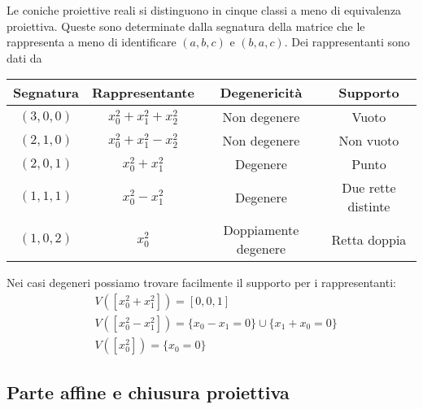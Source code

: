 \begin{multicols*}{2}
    \begin{theorem}
    Le coniche proiettive reali si distinguono in cinque classi a meno di equivalenza proiettiva. Queste sono determinate dalla segnatura della matrice che le rappresenta a meno di identificare $(a,b,c)$ e $(b,a,c)$. Dei rappresentanti sono dati da
    \begin{center}
    \footnotesize{\begin{tabular}{|c|c|c|c|}
    \hline
    Segnatura & Rappresentante & Degenericit\`a & Supporto\\\hline
    $(3,0,0)$ & $x_0^2+x_1^2+x_2^2$ & Non degenere & Vuoto\\
    $(2,1,0)$ & $x_0^2+x_1^2-x_2^2$ & Non degenere & Non vuoto\\
    $(2,0,1)$ & $x_0^2+x_1^2$ & Degenere & Punto\\
    $(1,1,1)$ & $x_0^2-x_1^2$ & Degenere & Due rette distinte\\
    $(1,0,2)$ & $x_0^2$ & Doppiamente degenere & Retta doppia\\\hline
    \end{tabular}}
    \end{center}
    \end{theorem}
    \begin{remark}
    Nei casi degeneri possiamo trovare facilmente il supporto per i rappresentanti:
    \begin{align*}
    &V([x_0^2+x_1^2])=[0,0,1]\\
    &V([x_0^2-x_1^2])=\{x_0-x_1=0\}\cup\{x_1+x_0=0\}\\
    &V([x_0^2])=\{x_0=0\}
    \end{align*}
    \end{remark}

    \subsection{Parte affine e chiusura proiettiva}


\end{multicols*}

